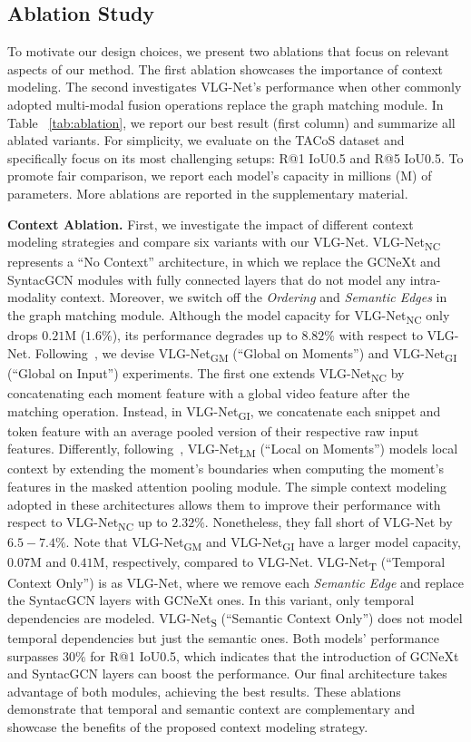 \documentclass[10pt,twocolumn,letterpaper]{article}
\begin{document}
\subsection{Ablation Study} \label{subsec: Abl}
To motivate our design choices, we present two ablations that focus on relevant aspects of our method. The first ablation showcases the importance of context modeling. The second investigates VLG-Net's performance when other commonly adopted multi-modal fusion operations replace the graph matching module. In Table ~\ref{tab:ablation}, we report our best result (first column) and summarize all ablated variants. For simplicity, we evaluate on the TACoS dataset and specifically focus on its most challenging setups: R@1 IoU0.5 and R@5 IoU0.5. To promote fair comparison, we report each model's capacity in millions (M) of parameters. More ablations are reported in the supplementary material. 


\noindent\textbf{Context Ablation.} First, we investigate the impact of different context modeling strategies and compare six variants with our VLG-Net. VLG-Net\textsubscript{NC} represents a ``No Context'' architecture, in which we replace the GCNeXt and SyntacGCN modules with fully connected layers that do not model any intra-modality context. Moreover, we switch off the \textit{Ordering} and \textit{Semantic Edges} in the graph matching module. 
Although the model capacity for VLG-Net\textsubscript{NC} only drops $0.21$M ($1.6\%$), its performance degrades up to $8.82\%$  with respect to VLG-Net.
Following~\cite{Hendricks_2017_ICCV}, we devise VLG-Net\textsubscript{GM} (``Global on Moments'') and VLG-Net\textsubscript{GI} (``Global on Input'') experiments. The first one extends VLG-Net\textsubscript{NC} by concatenating each moment feature with a global video feature after the matching operation. Instead, in VLG-Net\textsubscript{GI}, we concatenate each snippet and token feature with an average pooled version of their respective raw input features. 
Differently, following~\cite{Gao_2017_ICCV}, VLG-Net\textsubscript{LM} (``Local on Moments'') models local context by extending the moment's boundaries when computing the moment's features in the masked attention pooling module. 
The simple context modeling adopted in these architectures allows them to improve their performance with respect to VLG-Net\textsubscript{NC} up to $2.32\%$. Nonetheless, they fall short of VLG-Net by $6.5 - 7.4 \%$. 
Note that VLG-Net\textsubscript{GM} and VLG-Net\textsubscript{GI} have a larger model capacity, $0.07$M and $0.41$M, respectively, compared to VLG-Net.
VLG-Net\textsubscript{T} (``Temporal Context Only'') is as VLG-Net, where we remove each \textit{Semantic Edge} and replace the SyntacGCN layers with GCNeXt ones. In this variant, only temporal dependencies are modeled. VLG-Net\textsubscript{S} (``Semantic Context Only'') does not model temporal dependencies but just the semantic ones. 
Both models' performance surpasses $30 \%$ for R@1 IoU0.5, which indicates that the introduction of GCNeXt and SyntacGCN layers can boost the performance.  
Our final architecture takes advantage of both modules, achieving the best results. These ablations demonstrate that temporal and semantic context are complementary and showcase the benefits of the proposed context modeling strategy. 
\end{document}
